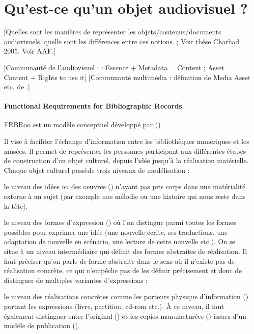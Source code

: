 \section{Qu'est-ce qu'un objet audiovisuel ?}\label{sec:dav}
[Quelles sont les manières de représenter les objets/contenus/documents audiovisuels, quelle sont les différences entre ces notions.
\cite{Morizet-mahoudeaux2005a} ;  Voir thèse Charhad 2005. Voir AAF.]

[Communauté de l'audiovisuel : \cite{Cox2006} : Essence + Metadata = Content ; \cite{Austerberry2004} Asset = Content + Rights to use it]
[Communauté multimédia : définition de Media Asset etc. de \cite{Furht2008}.]

\paragraph{Functional Requirements for Bibliographic Records}
FRBRoo est un modèle conceptuel développé par (\cite{Aalberg2008})

Il vise à faciliter l’échange d’information entre les bibliothèques numériques et les musées. 
Il permet de représenter les personnes participant aux différentes étapes de construction d’un objet culturel, depuis l’idée jusqu’à la réalisation matérielle.
Chaque objet culturel possède trois niveaux de modélisation :
\begin{liste}
	\item le niveau des idées ou des oeuvres () n’ayant pas pris corps dans une matérialité externe à un sujet (par exemple une mélodie ou une histoire qui nous reste dans la tête). 

	\item le niveau des formes d'expression () où l'on distingue parmi toutes les formes possibles pour exprimer une idée (une nouvelle écrite, ses traductions, une adaptation de nouvelle en scénario, une lecture de cette nouvelle etc.).
	On se situe à un niveau intermédiaire qui définit des formes abstraites de  réalisation.
	Il faut préciser qu'on parle de forme abstraite dans le sens où il n'existe pas de réalisation concrète, ce qui n'empêche pas de les définir précisement et donc de distinguer de multiples variantes d'expressions :

	
	\item le niveau des réalisations concrètes comme les porteurs physique d’information () portant les expressions (livre, partition, cd-rom etc.). 
	À ce niveau, il faut également distinguer entre l’original () et les copies manufacturées () issues d’un modèle de publication (). %
\end{liste}




